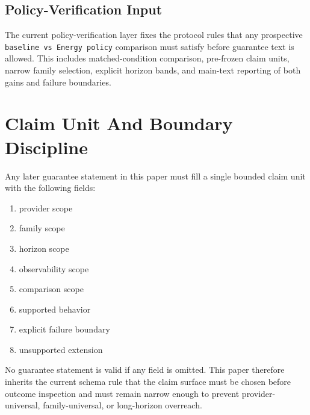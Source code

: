 \documentclass[11pt]{article}
\begin{document}
\subsection{Policy-Verification Input}

The current policy-verification layer fixes the protocol rules that any prospective
\texttt{baseline vs Energy policy} comparison must satisfy before guarantee text is
allowed. This includes matched-condition comparison, pre-frozen claim units, narrow
family selection, explicit horizon bands, and main-text reporting of both gains and
failure boundaries.

\section{Claim Unit And Boundary Discipline}

Any later guarantee statement in this paper must fill a single bounded claim unit
with the following fields:

\begin{enumerate}
\item provider scope
\item family scope
\item horizon scope
\item observability scope
\item comparison scope
\item supported behavior
\item explicit failure boundary
\item unsupported extension
\end{enumerate}

No guarantee statement is valid if any field is omitted. This paper therefore
inherits the current schema rule that the claim surface must be chosen before
outcome inspection and must remain narrow enough to prevent provider-universal,
family-universal, or long-horizon overreach.
\end{document}
